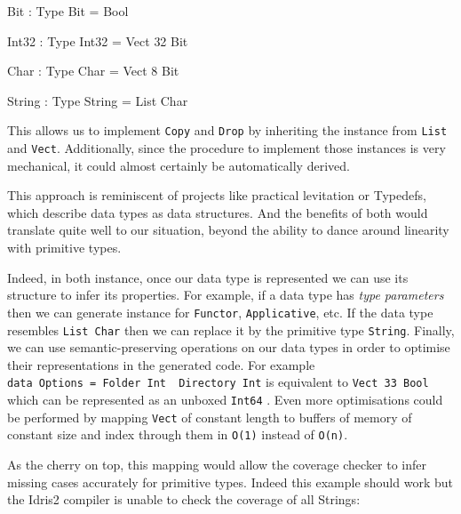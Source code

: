 \documentclass[
]{article}
\newenvironment{Shaded}{}{}
\newcommand{\DataTypeTok}[1]{\textcolor[rgb]{0.56,0.13,0.00}{#1}}
\newcommand{\DecValTok}[1]{\textcolor[rgb]{0.25,0.63,0.44}{#1}}
\newcommand{\OperatorTok}[1]{\textcolor[rgb]{0.40,0.40,0.40}{#1}}
\newcommand{\OtherTok}[1]{\textcolor[rgb]{0.00,0.44,0.13}{#1}}
\begin{document}
\begin{Shaded}
\begin{Highlighting}[]
\DataTypeTok{Bit} \OperatorTok{:} \DataTypeTok{Type}
\DataTypeTok{Bit} \OtherTok{=} \DataTypeTok{Bool}

\DataTypeTok{Int32} \OperatorTok{:} \DataTypeTok{Type}
\DataTypeTok{Int32} \OtherTok{=} \DataTypeTok{Vect} \DecValTok{32} \DataTypeTok{Bit}

\DataTypeTok{Char} \OperatorTok{:} \DataTypeTok{Type}
\DataTypeTok{Char} \OtherTok{=} \DataTypeTok{Vect} \DecValTok{8} \DataTypeTok{Bit}

\DataTypeTok{String} \OperatorTok{:} \DataTypeTok{Type}
\DataTypeTok{String} \OtherTok{=} \DataTypeTok{List} \DataTypeTok{Char}
\end{Highlighting}
\end{Shaded}

This allows us to implement \texttt{Copy} and \texttt{Drop} by
inheriting the instance from \texttt{List} and \texttt{Vect}.
Additionally, since the procedure to implement those instances is very
mechanical, it could almost certainly be automatically derived.

This approach is reminiscent of projects like practical levitation or
Typedefs, which describe data types as data structures. And the benefits
of both would translate quite well to our situation, beyond the ability
to dance around linearity with primitive types.

Indeed, in both instance, once our data type is represented we can use
its structure to infer its properties. For example, if a data type has
\emph{type parameters} then we can generate instance for
\texttt{Functor}, \texttt{Applicative}, etc. If the data type resembles
\texttt{List\ Char} then we can replace it by the primitive type
\texttt{String}. Finally, we can use semantic-preserving operations on
our data types in order to optimise their representations in the
generated code. For example
\texttt{data\ Options\ =\ Folder\ Int\ \textbar{}\ Directory\ Int} is
equivalent to \texttt{Vect\ 33\ Bool} which can be represented as an
unboxed \texttt{Int64} . Even more optimisations could be performed by
mapping \texttt{Vect} of constant length to buffers of memory of
constant size and index through them in \texttt{O(1)} instead of
\texttt{O(n)}.

As the cherry on top, this mapping would allow the coverage checker to
infer missing cases accurately for primitive types. Indeed this example
should work but the Idris2 compiler is unable to check the coverage of
all Strings:
\end{document}
